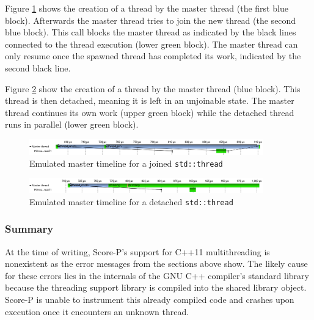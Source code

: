 Figure \ref{scorep:conc:pthread_join_timeline} shows the creation of a thread by the master thread (the first blue block). Afterwards the master thread tries to join the new thread (the second blue block). This call blocks the master thread as indicated by the black lines connected to the thread execution (lower green block). The master thread can only resume once the spawned thread has completed its work, indicated by the second black line.

Figure \ref{scorep:conc:pthread_detach_timeline} show the creation of a thread by the master thread (blue block). This thread is then detached, meaning it is left in an unjoinable state. The master thread continues its own work (upper green block) while the detached thread runs in parallel (lower green block).

\begin{figure}[htbp]
	\begin{center}
		\includegraphics[width=0.9\textwidth]{img/scorep_pthread_join_timeline.png}
		\caption{Emulated master timeline for a joined \texttt{std::thread}}
		\label{scorep:conc:pthread_join_timeline}
	\end{center}
\end{figure}

\begin{figure}[htbp]
	\begin{center}
		\includegraphics[width=0.9\textwidth]{img/scorep_pthread_detach_timeline.png}
		\caption{Emulated master timeline for a detached \texttt{std::thread}}
		\label{scorep:conc:pthread_detach_timeline}
	\end{center}
\end{figure}

\subsubsection{Summary}

At the time of writing, Score-P's support for C++11 multithreading is nonexistent as the error messages from the sections above show. The likely cause for these errors lies in the internals of the GNU C++ compiler's standard library because the threading support library is compiled into the shared library object. Score-P is unable to instrument this already compiled code and crashes upon execution once it encounters an unknown thread.

